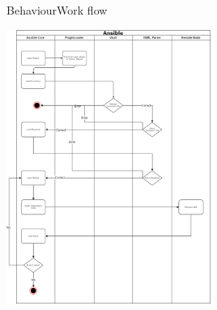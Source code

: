 \documentclass[10pt]{beamer}
\begin{document}
\begin{frame}[fragile]{Behaviour}{Work flow}
\begin{center}
\includegraphics[width=0.50\textwidth]{Flow.png}
\end{center}
\end{frame}
%

%
\end{document}
